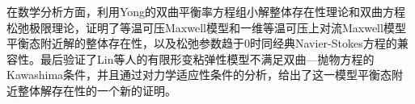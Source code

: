 \begin{cabstract}
在数学分析方面，利用Yong的双曲平衡率方程组小解整体存在性理论和双曲方程松弛极限理论，证明了等温可压Maxwell模型和一维等温可压上对流Maxwell模型平衡态附近解的整体存在性，以及松弛参数趋于$0$时同经典Navier-Stokes方程的兼容性。最后验证了Lin等人的有限形变粘弹性模型不满足双曲—抛物方程的Kawashima条件，并且通过对力学适应性条件的分析，给出了这一模型平衡态附近整体解存在性的一个新的证明。



\end{cabstract}

